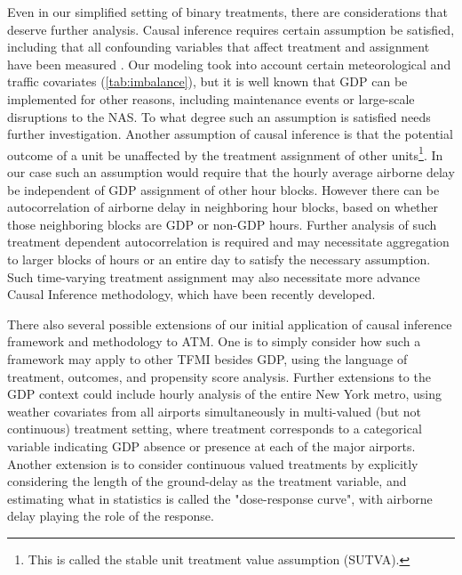 \documentclass[conference]{IEEEtran}
\begin{document}
Even in our simplified setting of binary treatments, there are considerations that deserve further analysis.  Causal inference requires certain assumption be satisfied, including that all confounding variables that affect treatment and assignment have been measured \cite{austin2011introduction}.  Our modeling took into account certain meteorological and traffic covariates (\ref{tab:imbalance}), but it is well known that GDP can be implemented for other reasons, including maintenance events or large-scale disruptions to the NAS.  To what degree such an assumption is satisfied needs further investigation.  Another assumption of causal inference is that the potential outcome of a unit be unaffected by the treatment assignment of other units\footnote{This is called the stable unit treatment value assumption (SUTVA).}.  In our case such an assumption would require that the hourly average airborne delay be independent of GDP assignment of other hour blocks.  However there can be autocorrelation of airborne delay in neighboring hour blocks, based on whether those neighboring blocks are GDP or non-GDP hours.  Further analysis of such treatment dependent autocorrelation is required and may necessitate aggregation to larger blocks of hours or an entire day to satisfy the necessary assumption.  Such time-varying treatment assignment may also necessitate more advance Causal Inference methodology, which have been recently developed\cite{imai2015robust}. 

There also several possible extensions of our initial application of causal inference framework and methodology to ATM.  One is to simply consider how such a framework may apply to other TFMI besides GDP, using the language of treatment, outcomes, and propensity score analysis. Further extensions to the GDP context could include hourly analysis of the entire New York metro, using weather covariates from all airports simultaneously in multi-valued (but not continuous) treatment setting, where treatment corresponds to a categorical variable indicating GDP absence or presence at each of the major airports.  Another extension is to consider continuous valued treatments by explicitly considering the length of the ground-delay as the treatment variable, and estimating what in statistics is called the "dose-response curve"\cite{fong2017covariate}, with airborne delay playing the role of the response.    
\end{document}
